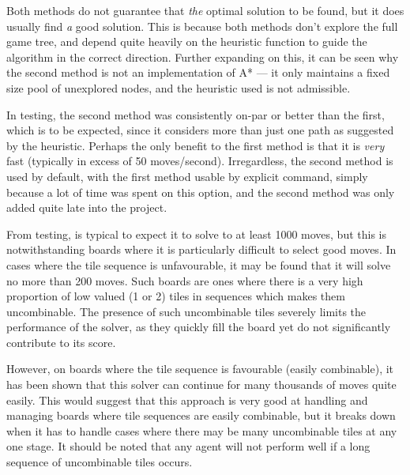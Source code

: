 \documentclass[a4paper, 11pt, titlepage]{report}
\begin{document}
Both methods do not guarantee that \emph{the} optimal solution to be found, but it does usually find \emph{a} good solution. This is because both methods don't explore the full game tree, and depend quite heavily on the heuristic function to guide the algorithm in the correct direction. Further expanding on this, it can be seen why the second method is not an implementation of A* --- it only maintains a fixed size pool of unexplored nodes, and the heuristic used is not admissible.

In testing, the second method was consistently on-par or better than the first, which is to be expected, since it considers more than just one path as suggested by the heuristic. Perhaps the only benefit to the first method is that it is \emph{very} fast (typically in excess of 50 moves/second). Irregardless, the second method is used by default, with the first method usable by explicit command, simply because a lot of time was spent on this option, and the second method was only added quite late into the project.

From testing, is typical to expect it to solve to at least 1000 moves, but this is notwithstanding boards where it is particularly difficult to select good moves. In cases where the tile sequence is unfavourable, it may be found that it will solve no more than 200 moves. Such boards are ones where there is a very high proportion of low valued (1 or 2) tiles in sequences which makes them uncombinable. The presence of such uncombinable tiles severely limits the performance of the solver, as they quickly fill the board yet do not significantly contribute to its score.

However, on boards where the tile sequence is favourable (easily combinable), it has been shown that this solver can continue for many thousands of moves quite easily. This would suggest that this approach is very good at handling and managing boards where tile sequences are easily combinable, but it breaks down when it has to handle cases where there may be many uncombinable tiles at  any one stage. It should be noted that any agent will not perform well if a long sequence of uncombinable tiles occurs. 
\end{document}
